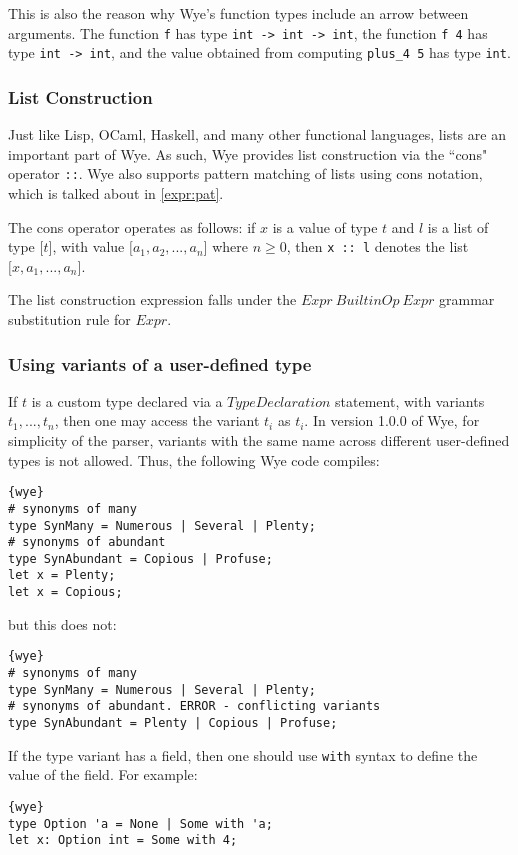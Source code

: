 \documentclass[a4paper, 12pt]{article}
\newcommand{\version}{1.0.0}
\begin{document}
This is also the reason why Wye's function types include an arrow between arguments. The function \texttt{f} has type \texttt{int -> int -> int}, the function \texttt{f 4} has type \texttt{int -> int}, and the value obtained from computing \texttt{plus\_4 5} has type \texttt{int}.

\subsubsection{List Construction}\label{expr:cons}
Just like Lisp, OCaml, Haskell, and many other functional languages, lists are an important part of Wye. As such, Wye provides list construction via the ``cons" operator \texttt{::}. Wye also supports pattern matching of lists using cons notation, which is talked about in \ref{expr:pat}.

The cons operator operates as follows: if $x$ is a value of type $t$ and $l$ is a list of type $\texttt{[}t\texttt{]}$, with value $\texttt{[}a_1, a_2, ..., a_n\texttt{]}$ where $n\geq 0$, then \texttt{x :: l} denotes the list $\texttt{[}x, a_1, ..., a_n\texttt{]}$.

The list construction expression falls under the $Expr\: BuiltinOp\: Expr$ grammar substitution rule for $Expr$.

\subsubsection{Using variants of a user-defined type}
If $t$ is a custom type declared via a $TypeDeclaration$ statement, with variants $t_1, ..., t_n$, then one may access the variant $t_i$ as $t_i$. In version \version{} of Wye, for simplicity of the parser, variants with the same name across different user-defined types is not allowed. Thus, the following Wye code compiles:
\begin{lstlisting}{wye}
# synonyms of many
type SynMany = Numerous | Several | Plenty;
# synonyms of abundant
type SynAbundant = Copious | Profuse;
let x = Plenty;
let x = Copious;
\end{lstlisting}
but this does not:
\begin{lstlisting}{wye}
# synonyms of many
type SynMany = Numerous | Several | Plenty;
# synonyms of abundant. ERROR - conflicting variants
type SynAbundant = Plenty | Copious | Profuse;
\end{lstlisting}

If the type variant has a field, then one should use \texttt{with} syntax to define the value of the field. For example:
\begin{lstlisting}{wye}
type Option 'a = None | Some with 'a;
let x: Option int = Some with 4;
\end{lstlisting}
\end{document}
